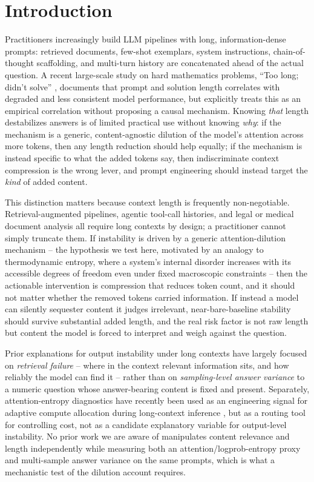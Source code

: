 \documentclass[11pt,letterpaper]{article}
\begin{document}
\section{Introduction}

Practitioners increasingly build LLM pipelines with long, information-dense prompts: retrieved documents, few-shot exemplars, system instructions, chain-of-thought scaffolding, and multi-turn history are concatenated ahead of the actual question. A recent large-scale study on hard mathematics problems, ``Too long; didn't solve'' \citep{Cabrera2026}, documents that prompt and solution length correlates with degraded and less consistent model performance, but explicitly treats this as an empirical correlation without proposing a causal mechanism. Knowing \emph{that} length destabilizes answers is of limited practical use without knowing \emph{why}: if the mechanism is a generic, content-agnostic dilution of the model's attention across more tokens, then any length reduction should help equally; if the mechanism is instead specific to what the added tokens say, then indiscriminate context compression is the wrong lever, and prompt engineering should instead target the \emph{kind} of added content.

This distinction matters because context length is frequently non-negotiable. Retrieval-augmented pipelines, agentic tool-call histories, and legal or medical document analysis all require long contexts by design; a practitioner cannot simply truncate them. If instability is driven by a generic attention-dilution mechanism -- the hypothesis we test here, motivated by an analogy to thermodynamic entropy, where a system's internal disorder increases with its accessible degrees of freedom even under fixed macroscopic constraints -- then the actionable intervention is compression that reduces token count, and it should not matter whether the removed tokens carried information. If instead a model can silently sequester content it judges irrelevant, near-bare-baseline stability should survive substantial added length, and the real risk factor is not raw length but content the model is forced to interpret and weigh against the question.

Prior explanations for output instability under long contexts have largely focused on \emph{retrieval failure} -- where in the context relevant information sits, and how reliably the model can find it \citep{Liu2023} -- rather than on \emph{sampling-level answer variance} to a numeric question whose answer-bearing content is fixed and present. Separately, attention-entropy diagnostics have recently been used as an engineering signal for adaptive compute allocation during long-context inference \citep{Xu2026}, but as a routing tool for controlling cost, not as a candidate explanatory variable for output-level instability. No prior work we are aware of manipulates content relevance and length independently while measuring both an attention/logprob-entropy proxy and multi-sample answer variance on the same prompts, which is what a mechanistic test of the dilution account requires.
\end{document}
